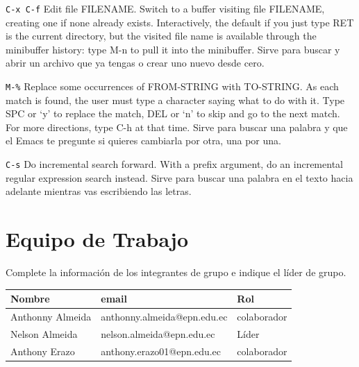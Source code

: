 \documentclass{article}
\begin{document}
 \texttt{C-x C-f} Edit file FILENAME.
Switch to a buffer visiting file FILENAME, creating one if none
already exists.
Interactively, the default if you just type RET is the current directory,
but the visited file name is available through the minibuffer history:
type M-n to pull it into the minibuffer.
Sirve para buscar y abrir un archivo que ya tengas o crear uno nuevo desde cero.

\texttt{M-\%} Replace some occurrences of FROM-STRING with TO-STRING.
As each match is found, the user must type a character saying
what to do with it.  Type SPC or ‘y’ to replace the match,
DEL or ‘n’ to skip and go to the next match.  For more directions,
type C-h at that time.
Sirve para buscar una palabra y que el Emacs te pregunte si quieres cambiarla por otra, una por una.

\texttt{C-s} Do incremental search forward.
With a prefix argument, do an incremental regular expression search instead.
Sirve para buscar una palabra en el texto hacia adelante mientras vas escribiendo las letras.


\section{Equipo de Trabajo}
\label{sec:org2d40c45}
Complete la información de los integrantes de grupo e indique el líder
de grupo.


\begin{center}
\begin{tabular}{lll}
\hline
Nombre & email & Rol\\[0pt]
\hline
Anthonny Almeida & anthonny.almeida@epn.edu.ec & colaborador\\[0pt]
Nelson Almeida & nelson.almeida@epn.edu.ec & Líder\\[0pt]
Anthony Erazo & anthony.erazo01@epn.edu.ec & colaborador\\[0pt]
\hline
\end{tabular}
\end{center}
\end{document}
